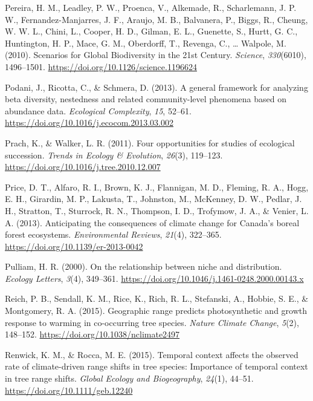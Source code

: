 \documentclass[
]{article}
\begin{document}
\leavevmode\hypertarget{ref-pereira_scenarios_2010}{}%
Pereira, H. M., Leadley, P. W., Proenca, V., Alkemade, R., Scharlemann,
J. P. W., Fernandez-Manjarres, J. F., Araujo, M. B., Balvanera, P.,
Biggs, R., Cheung, W. W. L., Chini, L., Cooper, H. D., Gilman, E. L.,
Guenette, S., Hurtt, G. C., Huntington, H. P., Mace, G. M., Oberdorff,
T., Revenga, C., \ldots{} Walpole, M. (2010). Scenarios for Global
Biodiversity in the 21st Century. \emph{Science}, \emph{330}(6010),
1496--1501. \url{https://doi.org/10.1126/science.1196624}

\leavevmode\hypertarget{ref-podani_general_2013}{}%
Podani, J., Ricotta, C., \& Schmera, D. (2013). A general framework for
analyzing beta diversity, nestedness and related community-level
phenomena based on abundance data. \emph{Ecological Complexity},
\emph{15}, 52--61. \url{https://doi.org/10.1016/j.ecocom.2013.03.002}

\leavevmode\hypertarget{ref-prach_four_2011}{}%
Prach, K., \& Walker, L. R. (2011). Four opportunities for studies of
ecological succession. \emph{Trends in Ecology \& Evolution},
\emph{26}(3), 119--123. \url{https://doi.org/10.1016/j.tree.2010.12.007}

\leavevmode\hypertarget{ref-price_anticipating_2013}{}%
Price, D. T., Alfaro, R. I., Brown, K. J., Flannigan, M. D., Fleming, R.
A., Hogg, E. H., Girardin, M. P., Lakusta, T., Johnston, M., McKenney,
D. W., Pedlar, J. H., Stratton, T., Sturrock, R. N., Thompson, I. D.,
Trofymow, J. A., \& Venier, L. A. (2013). Anticipating the consequences
of climate change for Canada's boreal forest ecosystems.
\emph{Environmental Reviews}, \emph{21}(4), 322--365.
\url{https://doi.org/10.1139/er-2013-0042}

\leavevmode\hypertarget{ref-pulliam_relationship_2000}{}%
Pulliam, H. R. (2000). On the relationship between niche and
distribution. \emph{Ecology Letters}, \emph{3}(4), 349--361.
\url{https://doi.org/10.1046/j.1461-0248.2000.00143.x}

\leavevmode\hypertarget{ref-reich_geographic_2015}{}%
Reich, P. B., Sendall, K. M., Rice, K., Rich, R. L., Stefanski, A.,
Hobbie, S. E., \& Montgomery, R. A. (2015). Geographic range predicts
photosynthetic and growth response to warming in co-occurring tree
species. \emph{Nature Climate Change}, \emph{5}(2), 148--152.
\url{https://doi.org/10.1038/nclimate2497}

\leavevmode\hypertarget{ref-renwick_temporal_2015}{}%
Renwick, K. M., \& Rocca, M. E. (2015). Temporal context affects the
observed rate of climate-driven range shifts in tree species: Importance
of temporal context in tree range shifts. \emph{Global Ecology and
Biogeography}, \emph{24}(1), 44--51.
\url{https://doi.org/10.1111/geb.12240}
\end{document}

